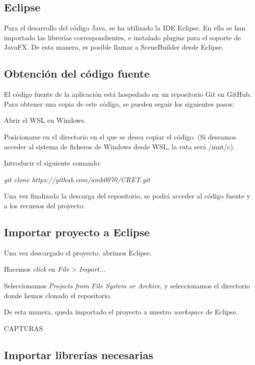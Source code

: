 
\subsection{Eclipse}

Para el desarrollo del código Java, se ha utilizado la IDE Eclipse. En ella se han importado las librerías correspondientes, e instalado plugins para el soporte de JavaFX. De esta manera, es posible llamar a SceneBuilder desde Eclipse.


\subsection{Obtención del código fuente}

El código fuente de la aplicación está hospedado en un repositorio Git en GitHub. Para obtener una copia de este código, se pueden seguir los siguientes pasos:

Abrir el WSL en Windows.

Posicionarse en el directorio en el que se desea copiar el código. (Si deseamos acceder al sistema de ficheros de Windows desde WSL, la ruta será /mnt/c).

Introducir el siguiente comando:

\emph{git clone https://github.com/amb0070/CRET.git}

Una vez finalizada la descarga del repositorio, se podrá acceder al código fuente y a los recursos del proyecto.


\subsection{Importar proyecto a Eclipse}

Una vez descargado el proyecto, abrimos Eclipse.

Hacemos \emph{click} en \emph{File} > \emph{Import...}

Seleccionamos \emph{Projects from File System or Archive}, y seleccionamos el directorio donde hemos clonado el repositorio.

De esta manera, queda importado el proyecto a nuestro \emph{workspace} de Eclipse.

CAPTURAS

\subsection{Importar librerías necesarias}

